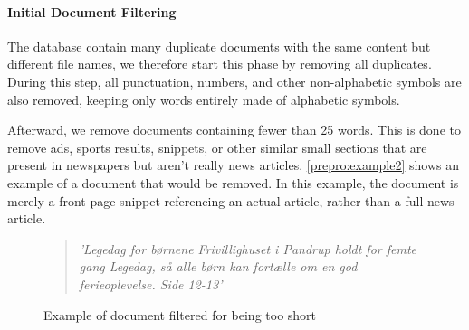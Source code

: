 \paragraph{Initial Document Filtering}
The database contain many duplicate documents with the same content but different file names, we therefore start this phase by removing all duplicates.
During this step, all punctuation, numbers, and other non-alphabetic symbols are also removed, keeping only words entirely made of alphabetic symbols.

Afterward, we remove documents containing fewer than 25 words.
This is done to remove ads, sports results, snippets, or other similar small sections that are present in newspapers but aren't really news articles.
\autoref{prepro:example2} shows an example of a document that would be removed. In this example, the document is merely a front-page snippet referencing an actual article, rather than a full news article.
\begin{figure}[h]
	\begin{framed}
		\begin{quote}
			\textit{
				'Legedag for børnene Frivillighuset i Pandrup holdt for femte gang Legedag, så alle børn kan fortælle om en god ferieoplevelse. Side 12-13'
			}
		\end{quote}
	\end{framed}
	\caption{Example of document filtered for being too short}
	\label{prepro:example2}
\end{figure}


